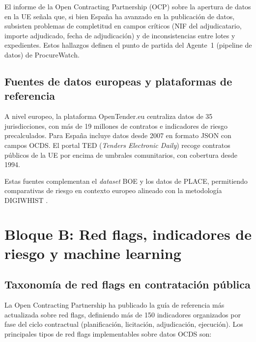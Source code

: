 \documentclass[11pt,a4paper,spanish]{book}
\numberwithin{equation}{chapter}
\numberwithin{figure}{chapter}
\begin{document}
El informe de la Open Contracting Partnership (OCP) sobre la apertura de datos en la UE \cite{OCP2023EUOpenData} se{\~n}ala que, si bien Espa{\~n}a ha avanzado en la publicaci{\'o}n de datos, subsisten problemas de completitud en campos cr{\'i}ticos (NIF del adjudicatario, importe adjudicado, fecha de adjudicaci{\'o}n) y de inconsistencias entre lotes y expedientes. Estos hallazgos definen el punto de partida del Agente~1 (pipeline de datos) de ProcureWatch.

\subsection{Fuentes de datos europeas y plataformas de referencia}

A nivel europeo, la plataforma OpenTender.eu \cite{OpenTenderEU,FazekasOpentender2025} centraliza datos de 35 jurisdicciones, con m{\'a}s de 19 millones de contratos e indicadores de riesgo precalculados. Para Espa{\~n}a incluye datos desde 2007 en formato JSON con campos OCDS. El portal TED (\textit{Tenders Electronic Daily}) recoge contratos p{\'u}blicos de la UE por encima de umbrales comunitarios, con cobertura desde 1994.

Estas fuentes complementan el \textit{dataset} BOE y los datos de PLACE, permitiendo comparativas de riesgo en contexto europeo alineado con la metodolog{\'i}a DIGIWHIST \cite{Fazekas2020DIGIWHIST}.

\section{Bloque B: Red flags, indicadores de riesgo y machine learning}

\subsection{Taxonom{\'i}a de red flags en contrataci{\'o}n p{\'u}blica}

La Open Contracting Partnership \cite{OCP2024RedFlags} ha publicado la gu{\'i}a de referencia m{\'a}s actualizada sobre red flags, definiendo m{\'a}s de 150 indicadores organizados por fase del ciclo contractual (planificaci{\'o}n, licitaci{\'o}n, adjudicaci{\'o}n, ejecuci{\'o}n). Los principales tipos de red flags implementables sobre datos OCDS son:
\end{document}
